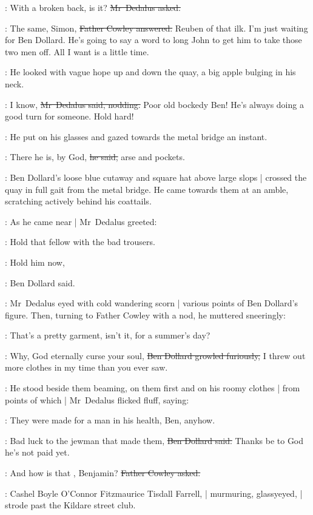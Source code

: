 \simon:
With a broken back, is it?
\sout{Mr~Dedalus asked.}

\cowley:
The same, Simon,
\sout{Father Cowley answered.}
Reuben of that ilk.
I'm just waiting for Ben Dollard.
He's going to say a word to long John
to get him to take those two men off.
All I want is a little time.

:
He looked with vague hope up and down the quay,
a big apple bulging in his neck.

\simon:
I know,
\sout{Mr~Dedalus said, nodding.}
Poor old bockedy Ben!
He's always doing a good turn for someone.
Hold hard!

:
He put on his glasses
and gazed towards the metal bridge an instant.

\simon:
There he is, by God,
\sout{he said,}%
arse and pockets.

:
Ben Dollard's loose blue cutaway and square hat above large slops |
crossed the quay in full gait
from the metal bridge.
He came towards them at an amble,
scratching actively behind his coattails.

:
As he came near |
Mr~Dedalus greeted:

\simon:
Hold that fellow with the bad trousers.

\dollard:
Hold him now,

:
Ben Dollard said.

:
Mr~Dedalus eyed with cold wandering scorn |
various points of Ben Dollard's figure.
Then,
turning to Father Cowley with a nod,
he muttered sneeringly:

\simon:
That's a pretty garment, isn't it,%
for a summer's day?

\dollard:
Why, God eternally curse your soul,
\sout{Ben Dollard growled furiously,}
I threw out more clothes in my time than you ever saw.

:
He stood beside them beaming,
on them first and on his roomy clothes |
from points of which |
Mr~Dedalus flicked fluff,
saying:

\simon:
They were made for a man in his health, Ben, anyhow.

\dollard:
Bad luck to the jewman that made them,
\sout{Ben Dollard said.}
Thanks be to God he's not paid yet.

\cowley:
And how is that , Benjamin?
\sout{Father Cowley asked.}

\begin{interject}
    :
    Cashel Boyle O'Connor Fitzmaurice Tisdall Farrell, |
    murmuring, glassy\-eyed, |
    strode past the Kildare street club.
\end{interject}%

